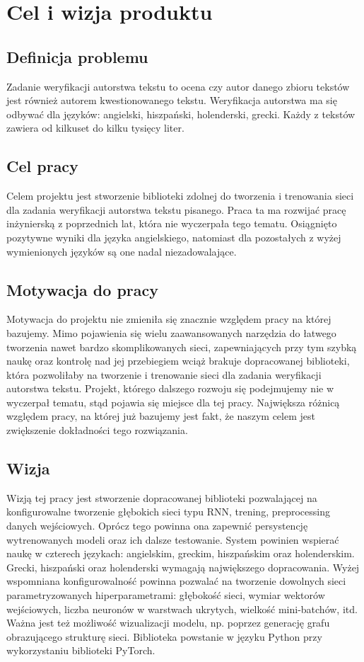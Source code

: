 \newpage
\section{Cel i wizja produktu}

\subsection{Definicja problemu}
Zadanie weryfikacji autorstwa tekstu to ocena czy autor danego zbioru tekstów jest również 
autorem kwestionowanego tekstu. Weryfikacja autorstwa ma się odbywać dla języków: angielski, 
hiszpański, holenderski, grecki. Każdy z tekstów zawiera od kilkuset do kilku tysięcy liter.
 
\subsection{Cel pracy}
Celem projektu jest stworzenie biblioteki zdolnej do tworzenia i trenowania sieci dla zadania 
weryfikacji autorstwa tekstu pisanego. Praca ta ma rozwijać pracę inżynierską z poprzednich lat, 
która nie wyczerpała tego tematu. Osiągnięto pozytywne wyniki dla języka angielskiego, natomiast 
dla pozostałych z wyżej wymienionych języków są one nadal niezadowalające.


\subsection{Motywacja do pracy}
Motywacja do projektu nie zmieniła się znacznie względem pracy na której bazujemy. Mimo pojawienia 
się wielu zaawansowanych narzędzia do łatwego tworzenia nawet bardzo skomplikowanych sieci, 
zapewniających przy tym szybką naukę oraz kontrolę nad jej przebiegiem wciąż brakuje dopracowanej 
biblioteki, która pozwoliłaby na tworzenie i trenowanie sieci dla zadania weryfikacji autorstwa 
tekstu. Projekt, którego dalszego rozwoju się podejmujemy nie w wyczerpał tematu, stąd pojawia się 
miejsce dla tej pracy. Największa różnicą względem pracy, na której już bazujemy jest fakt, że 
naszym celem jest zwiększenie dokładności tego rozwiązania.

\subsection{Wizja}
Wizją tej pracy jest stworzenie dopracowanej biblioteki pozwalającej na konfigurowalne tworzenie 
głębokich sieci typu RNN, trening, preprocessing danych wejściowych. Oprócz tego powinna ona 
zapewnić persystencję wytrenowanych modeli oraz ich dalsze testowanie. System powinien wspierać 
naukę w czterech językach: angielskim, greckim, hiszpańskim oraz holenderskim. Grecki, hiszpański 
oraz holenderski wymagają największego dopracowania. Wyżej wspomniana konfigurowalność powinna 
pozwalać na tworzenie dowolnych sieci parametryzowanych hiperparametrami: głębokość sieci, wymiar 
wektorów wejściowych, liczba neuronów w warstwach ukrytych, wielkość mini-batchów, itd. Ważna jest 
też możliwość wizualizacji modelu, np. poprzez generację grafu obrazującego strukturę sieci. 
Biblioteka powstanie w języku Python przy wykorzystaniu biblioteki PyTorch.

